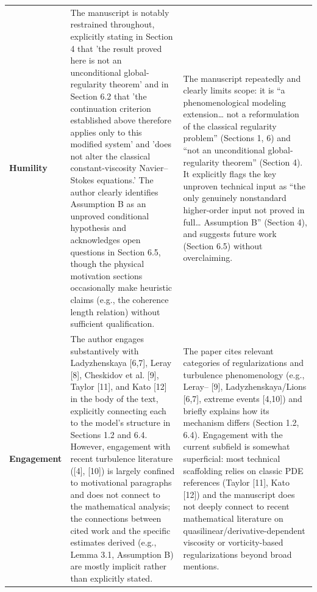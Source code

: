 \documentclass[11pt]{article}
\begin{document}
\begin{longtable}{@{} p{2.2cm} p{6.3cm} p{6.3cm} @{}}
\rowcolor{rowgray}
\textbf{Humility} &
The manuscript is notably restrained throughout, explicitly stating in Section 4 that 'the result proved here is not an unconditional global-regularity theorem' and in Section 6.2 that 'the continuation criterion established above therefore applies only to this modified system' and 'does not alter the classical constant-viscosity Navier--Stokes equations.' The author clearly identifies Assumption B as an unproved conditional hypothesis and acknowledges open questions in Section 6.5, though the physical motivation sections occasionally make heuristic claims (e.g., the coherence length relation) without sufficient qualification. &
The manuscript repeatedly and clearly limits scope: it is ``a phenomenological modeling extension\ldots{} not a reformulation of the classical regularity problem'' (Sections 1, 6) and ``not an unconditional global-regularity theorem'' (Section 4). It explicitly flags the key unproven technical input as ``the only genuinely nonstandard higher-order input not proved in full\ldots{} Assumption B'' (Section 4), and suggests future work (Section 6.5) without overclaiming. \\[6pt]

\textbf{Engagement} &
The author engages substantively with Ladyzhenskaya [6,7], Leray [8], Cheskidov et al. [9], Taylor [11], and Kato [12] in the body of the text, explicitly connecting each to the model's structure in Sections 1.2 and 6.4. However, engagement with recent turbulence literature ([4], [10]) is largely confined to motivational paragraphs and does not connect to the mathematical analysis; the connections between cited work and the specific estimates derived (e.g., Lemma 3.1, Assumption B) are mostly implicit rather than explicitly stated. &
The paper cites relevant categories of regularizations and turbulence phenomenology (e.g., Leray--\textalpha{} [9], Ladyzhenskaya/Lions [6,7], extreme events [4,10]) and briefly explains how its mechanism differs (Section 1.2, 6.4). Engagement with the current subfield is somewhat superficial: most technical scaffolding relies on classic PDE references (Taylor [11], Kato [12]) and the manuscript does not deeply connect to recent mathematical literature on quasilinear/derivative-dependent viscosity or vorticity-based regularizations beyond broad mentions. \\[6pt]


\end{longtable}
\end{document}
